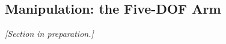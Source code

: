 \subsection{Manipulation: the Five-DOF Arm}
\label{sec:phaseA_manip}

\emph{[Section in preparation.]}
